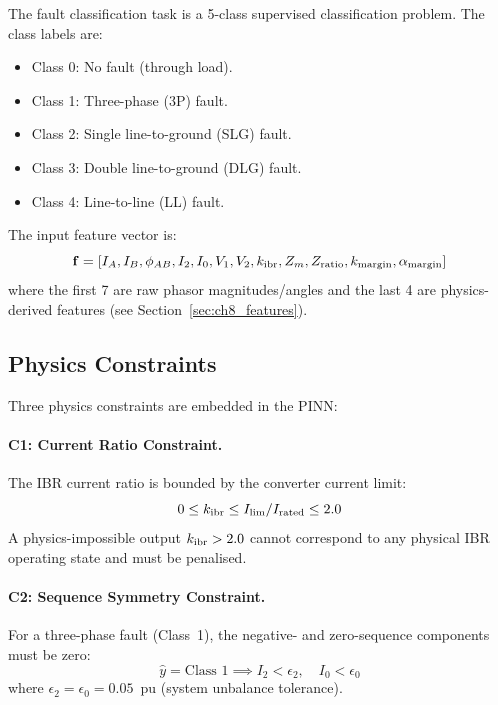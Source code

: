 The fault classification task is a 5-class supervised classification
problem. The class labels are:
\begin{itemize}
\item Class 0: No fault (through load).
\item Class 1: Three-phase (3P) fault.
\item Class 2: Single line-to-ground (SLG) fault.
\item Class 3: Double line-to-ground (DLG) fault.
\item Class 4: Line-to-line (LL) fault.
\end{itemize}
The input feature vector is:
\begin{equation}
  \mathbf{f} = [I_A, I_B, \phi_{AB}, I_2, I_0, V_1, V_2, k_{\mathrm{ibr}},
                Z_m, Z_\mathrm{ratio}, k_\mathrm{margin}, \alpha_\mathrm{margin}]
  \label{eq:ch8_features}
\end{equation}
where the first 7 are raw phasor magnitudes/angles and the last 4 are
physics-derived features (see Section~\ref{sec:ch8_features}).

\subsection{Physics Constraints}

Three physics constraints are embedded in the PINN:

\paragraph{C1: Current Ratio Constraint.}
The IBR current ratio is bounded by the converter current limit:
\begin{equation}
  0 \leq k_{\mathrm{ibr}} \leq I_\mathrm{lim}/I_\mathrm{rated} \leq 2.0
  \label{eq:ch8_c1}
\end{equation}
A physics-impossible output $k_{\mathrm{ibr}} > 2.0$ cannot correspond to any
physical IBR operating state and must be penalised.

\paragraph{C2: Sequence Symmetry Constraint.}
For a three-phase fault (Class~1), the negative- and zero-sequence
components must be zero:
\begin{equation}
  \hat{y} = \text{Class 1} \implies I_2 < \epsilon_2, \quad I_0 < \epsilon_0
  \label{eq:ch8_c2}
\end{equation}
where $\epsilon_2 = \epsilon_0 = 0.05$~pu (system unbalance tolerance).

